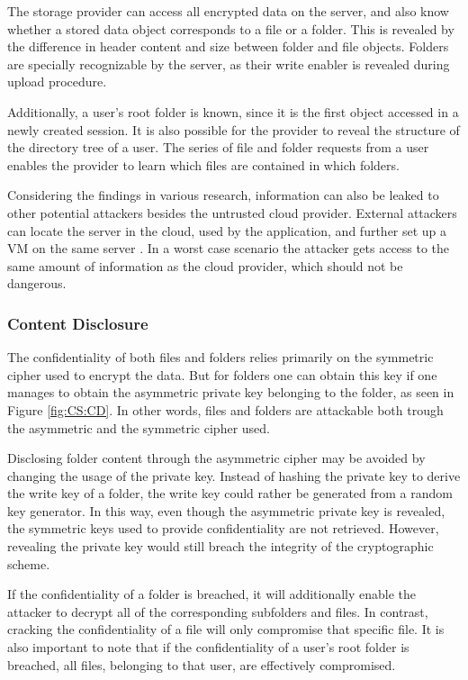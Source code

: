 \documentclass[pdftex,english,10pt,b5paper,twoside]{book}
\begin{document}
The storage provider can access all encrypted data on the server, and also know
whether a stored data object corresponds to a file or a folder. This is
revealed by the difference in header content and size between folder and file
objects. Folders are specially recognizable by the server, as their write
enabler is revealed during upload procedure. 

Additionally, a user's root folder is known, since it is the first object
accessed in a newly created session. It is also possible for the provider to
reveal the structure of the directory tree of a user. The series of file and
folder requests from a user enables the provider to learn which files are
contained in which folders.

Considering the findings in various research, information can also be leaked to
other potential attackers besides the untrusted cloud provider. External
attackers can locate the server in the cloud, used by the application, and
further set up a \ac{VM} on the same server \cite{cloud_getoff}. In a worst
case scenario the attacker gets access to the same amount of information as the
cloud provider, which should not be dangerous.

\subsubsection{Content Disclosure}

The confidentiality of both files and folders relies primarily on the symmetric
cipher used to encrypt the data. But for folders one can obtain this key if one
manages to obtain the asymmetric private key belonging to the folder, as seen
in Figure \ref{fig:CS:CD}. In other words, files and folders are attackable
both trough the asymmetric and the symmetric cipher used.

Disclosing folder content through the asymmetric cipher may be avoided by
changing the usage of the private key. Instead of hashing the private key to
derive the write key of a folder, the write key could rather be generated from
a random key generator. In this way, even though the asymmetric private key is
revealed, the symmetric keys used to provide confidentiality are not retrieved.
However, revealing the private key would still breach the integrity of the
cryptographic scheme.

If the confidentiality of a folder is breached, it will additionally enable the
attacker to decrypt all of the corresponding subfolders and files. In
contrast, cracking the confidentiality of a file will only compromise that
specific file. It is also important to note that if the confidentiality of a
user's root folder is breached, all files, belonging to that user, are
effectively compromised.
\end{document}
